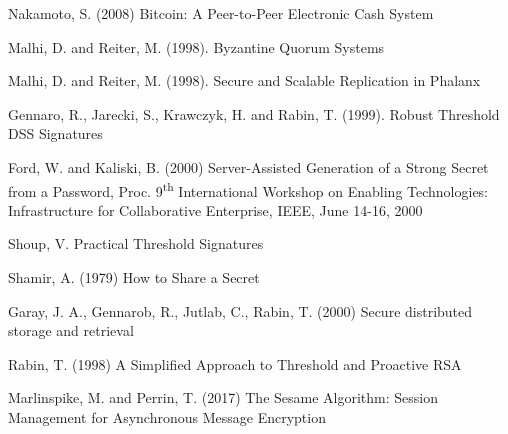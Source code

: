 \begin{thebibliography}{99}

  Nakamoto, S. (2008) Bitcoin: A Peer-to-Peer Electronic Cash System

  Malhi, D. and Reiter, M. (1998). Byzantine Quorum Systems

  Malhi, D. and Reiter, M. (1998). Secure and Scalable Replication in Phalanx

  Gennaro, R., Jarecki, S., Krawczyk, H. and Rabin, T. (1999). Robust
  Threshold DSS Signatures

  Ford, W. and Kaliski, B. (2000) Server-Assisted Generation of a
  Strong Secret from a Password, Proc. 9\textsuperscript{th} International
  Workshop on Enabling Technologies: Infrastructure for Collaborative
  Enterprise, IEEE, June 14-16, 2000

  Shoup, V. Practical Threshold Signatures
  
  Shamir, A. (1979) How to Share a Secret

  Garay, J. A., Gennarob, R., Jutlab, C., Rabin, T. (2000)  Secure
  distributed storage and retrieval

  Rabin, T. (1998) A Simplified Approach to Threshold and Proactive RSA

  Marlinspike, M. and Perrin, T. (2017) The Sesame Algorithm: Session Management for Asynchronous Message Encryption

\end{thebibliography}
